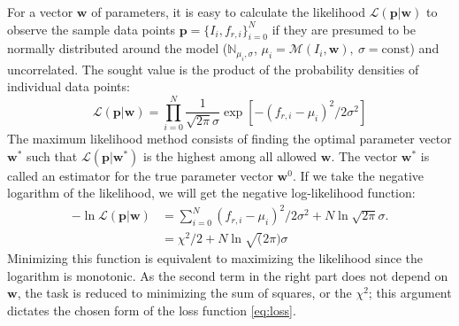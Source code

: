 \documentclass[%
 aip,
 draft,
 amsmath,amssymb,
 reprint,%
]{revtex4-1}
\begin{document}
	
For a vector $\mathbf{w}$ of parameters, it is easy to calculate the likelihood $ \mathcal{L}(\mathbf{p}|\mathbf{w}) $ to observe the sample data points $\mathbf{p} = \{I_i, f_{r,i}\}_{i=0}^N$ if they are presumed to be normally distributed around the model ($\mathbb{N}_{\mu_i, \sigma}$, $\mu_i = \mathcal{M}(I_i, \mathbf{w}),\ \sigma = \text{const}$) and uncorrelated. The sought value is the product of the probability densities of individual data points:
\begin{equation}
\mathcal{L}(\mathbf{p}|\mathbf{w}) = \prod_{i=0}^{N} \frac{1}{\sqrt{2\pi}\sigma} \exp[ -(f_{r,i} - \mu_i)^2 / 2 \sigma^2]\label{eq:MLE} 
\end{equation}
The maximum likelihood method consists of finding the optimal parameter vector $\mathbf{w}^*$ such that $ \mathcal{L}(\mathbf{p}|\mathbf{w}^*) $ is the highest among all allowed $\mathbf{w} $. The vector $\mathbf{w}^*$ is called an estimator for the true parameter vector $\mathbf{w}^0$. If we take the negative logarithm of the likelihood, we will get the negative log-likelihood function:
\begin{align*}
- \ln \mathcal{L}(\mathbf{p}|\mathbf{w}) &= \sum_{i=0}^N (f_{r,i} - \mu_i)^2 / 2 \sigma^2 + N \ln\sqrt{2\pi}\sigma.
\label{eq:logL} \\
&= \chi^2/2 + N\ln \sqrt(2\pi)\sigma
\end{align*}
Minimizing this function is equivalent to maximizing the likelihood since the logarithm is monotonic. As the second term in the right part does not depend on $\mathbf{w}$, the task is reduced to minimizing the sum of squares, or the $\chi^2$; this argument dictates the chosen form of the loss function \eqref{eq:loss}. 
\end{document}
